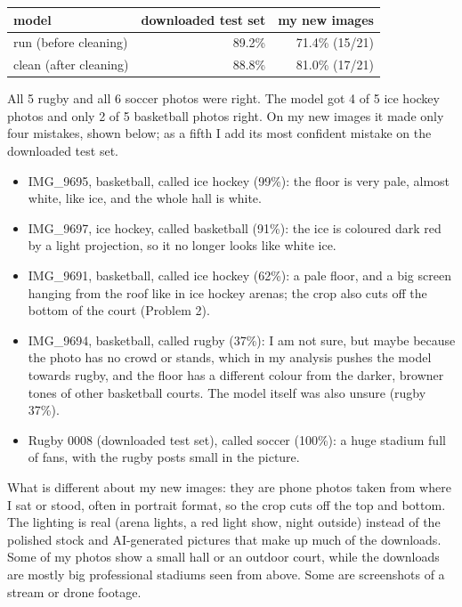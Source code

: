 \documentclass[11pt]{article}
\begin{document}

\begin{center}
\begin{tabular}{lrr}
\toprule
model & downloaded test set & my new images \\
\midrule
run (before cleaning) & 89.2\% & 71.4\% (15/21) \\
clean (after cleaning) & 88.8\% & 81.0\% (17/21) \\
\bottomrule
\end{tabular}
\end{center}


All 5 rugby and all 6 soccer photos were right. The model got 4 of 5 ice hockey
photos and only 2 of 5 basketball photos right. On my new images it made only
four mistakes, shown below; as a fifth I add its most confident mistake on the
downloaded test set.


\begin{itemize}
\item IMG\_9695, basketball, called ice hockey (99\%): the floor is very pale,
almost white, like ice, and the whole hall is white.
\item IMG\_9697, ice hockey, called basketball (91\%): the ice is coloured dark red
by a light projection, so it no longer looks like white ice.
\item IMG\_9691, basketball, called ice hockey (62\%): a pale floor, and a big screen
hanging from the roof like in ice hockey arenas; the crop also cuts off the
bottom of the court (Problem 2).
\item IMG\_9694, basketball, called rugby (37\%): I am not sure, but maybe because
the photo has no crowd or stands, which in my analysis pushes the model towards
rugby, and the floor has a different colour from the darker, browner tones of
other basketball courts. The model itself was also unsure (rugby 37\%).
\item Rugby 0008 (downloaded test set), called soccer (100\%): a huge stadium full
of fans, with the rugby posts small in the picture.
\end{itemize}

What is different about my new images: they are phone photos taken from where I
sat or stood, often in portrait format, so the crop cuts off the top and bottom.
The lighting is real (arena lights, a red light show, night outside) instead of
the polished stock and AI-generated pictures that make up much of the downloads.
Some of my photos show a small hall or an outdoor court, while the downloads are
mostly big professional stadiums seen from above. Some are screenshots of a stream
or drone footage.
\end{document}
